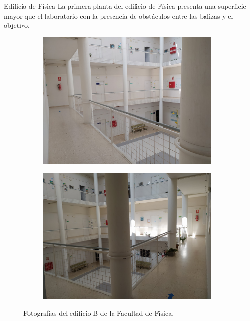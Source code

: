 \documentclass[xcolor=table]{beamer}
\begin{document}
  \begin{frame}{Edificio de Física}
    La primera planta del edificio de Física presenta una superficie mayor que el laboratorio con la presencia de obstáculos entre las balizas y el objetivo.

    \begin{figure}[H]
      \begin{subfigure}[b]{.45\textwidth}
        \centering
        \includegraphics[width=\textwidth]{pic/fisica1.jpg}
        \label{fig:foto_fisica1}
      \end{subfigure}
      \begin{subfigure}[b]{.45\textwidth}
        \centering
        \includegraphics[width=\textwidth]{pic/fisica2.jpg}
        \label{fig:foto_fisica2}
      \end{subfigure}
      \caption{Fotografías del edificio B de la Facultad de Física.}
      \label{fig:foto_fisica}
    \end{figure}
  \end{frame}
\end{document}
